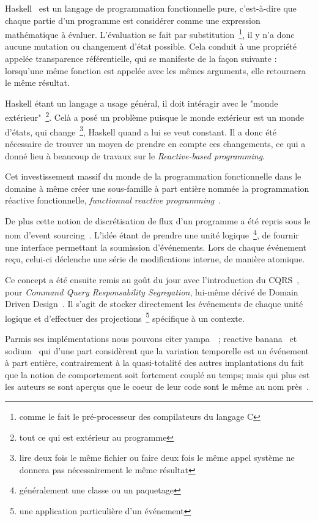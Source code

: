 \documentclass{article}
\begin{document}
Haskell~\cite{haskell} est un langage de programmation fonctionnelle pure, c'est-à-dire
que chaque partie d'un programme est considérer comme une expression mathématique
à évaluer. L'évaluation se fait par substitution~\footnote{comme le fait le pré-processeur
des compilateurs du langage C}, il y n'a donc aucune mutation ou changement d'état
possible. Cela conduit à une propriété appelée transparence référentielle, qui se
manifeste de la façon suivante : lorsqu'une même fonction est appelée avec les mêmes
arguments, elle retournera le même résultat.

Haskell étant un langage a usage général, il doit intéragir avec le "monde extérieur"~\footnote{tout ce qui est extérieur au programme}.
Celà a posé un problème puisque le monde extérieur est un monde d'états, qui change~\footnote{lire deux fois le même fichier ou faire deux fois le même appel système ne donnera pas nécessairement le même résultat},
Haskell quand a lui se veut constant.
Il a donc été nécessaire de trouver un moyen de prendre en compte ces changements,
ce qui a donné lieu à beaucoup de travaux sur le \emph{Reactive-based programming}.

Cet investissement massif du monde de la programmation fonctionnelle
dans le domaine à même créer une sous-famille à part entière nommée la
programmation réactive fonctionnelle, \emph{functionnal reactive programming}~\cite{frp}.

De plus cette notion de discrétisation de flux d'un programme a été repris
sous le nom d'event sourcing~\cite{eventsourcing}. 
L'idée étant de prendre une unité logique~\footnote{généralement une classe ou un paquetage},
de fournir une interface permettant la soumission d'événements. Lors de chaque événement
reçu, celui-ci déclenche une série de modifications interne, de manière atomique.

Ce concept a été ensuite remis au goût du jour avec l'introduction du CQRS~\cite{cqrs},
pour \emph{Command Query Responsability Segregation}, lui-même dérivé de
Domain Driven Design~\cite{ddd}.
Il s'agit de stocker directement les événements de chaque unité logique et d'effectuer
des projections~\footnote{une application particulière d'un événement} spécifique à un contexte.

Parmis ses implémentations nous pouvons citer yampa~\cite{yampa}~\cite{arrows};
reactive banana~\cite{reactivebanana} et sodium~\cite{sodium} qui d'une part considèrent que
la variation temporelle est un événement à part entière, contrairement à
la quasi-totalité des autres implantations du fait que la notion de
comportement soit fortement couplé au temps; mais qui plus est les
auteurs se sont aperçus que le coeur de leur code sont le même au nom
près~\cite{sodium_talk}.
\end{document}

